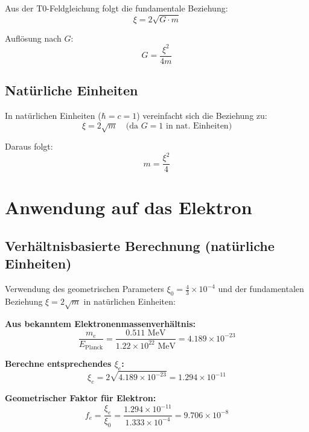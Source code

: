 \documentclass[12pt,a4paper]{article}
\begin{document}
	Aus der T0-Feldgleichung folgt die fundamentale Beziehung:
	\begin{equation}
		\xi = 2\sqrt{G \cdot m}
	\end{equation}
	
	Auflösung nach $G$:
	\begin{equation}
		\boxed{G = \frac{\xi^2}{4m}}
	\end{equation}
	
	\subsection{Natürliche Einheiten}
	
	In natürlichen Einheiten ($\hbar = c = 1$) vereinfacht sich die Beziehung zu:
	\begin{equation}
		\xi = 2\sqrt{m} \quad \text{(da } G = 1 \text{ in nat. Einheiten)}
	\end{equation}
	
	Daraus folgt:
	\begin{equation}
		m = \frac{\xi^2}{4}
	\end{equation}
	
	\section{Anwendung auf das Elektron}
	
	\subsection{Verhältnisbasierte Berechnung (natürliche Einheiten)}
	
	Verwendung des geometrischen Parameters $\xi_0 = \frac{4}{3} \times 10^{-4}$ und der fundamentalen Beziehung $\xi = 2\sqrt{m}$ in natürlichen Einheiten:
	
	\textbf{Aus bekanntem Elektronenmassenverhältnis:}
	\begin{equation}
		\frac{m_e}{E_{\text{Planck}}} = \frac{0.511 \text{ MeV}}{1.22 \times 10^{22} \text{ MeV}} = 4.189 \times 10^{-23}
	\end{equation}
	
	\textbf{Berechne entsprechendes $\xi_e$:}
	\begin{equation}
		\xi_e = 2\sqrt{4.189 \times 10^{-23}} = 1.294 \times 10^{-11}
	\end{equation}
	
	\textbf{Geometrischer Faktor für Elektron:}
	\begin{equation}
		f_e = \frac{\xi_e}{\xi_0} = \frac{1.294 \times 10^{-11}}{1.333 \times 10^{-4}} = 9.706 \times 10^{-8}
	\end{equation}
	
\end{document}
